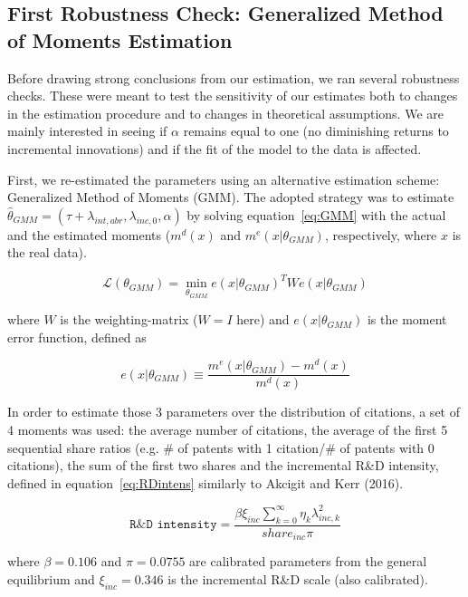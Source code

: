 \documentclass[letterpaper,12pt]{article}
\theoremstyle{definition}
\begin{document}
\subsection{First Robustness Check: Generalized Method of Moments Estimation}

Before drawing strong conclusions from our estimation, we ran several robustness checks. These were meant to test the sensitivity of our estimates both to changes in the estimation procedure and to changes in theoretical assumptions. We are mainly interested in seeing if $\alpha$ remains equal to one (no diminishing returns to incremental innovations) and if the fit of the model to the data is affected.

First, we re-estimated the parameters using an alternative estimation scheme: Generalized Method of Moments (GMM). The adopted strategy was to estimate $\hat{\theta}_{GMM} = (\tau + \lambda_{int,abr}, \lambda_{inc,0}, \alpha)$ by solving equation~\eqref{eq:GMM} with the actual and the estimated moments ($m^d(x)$ and $m^e(x|\theta_{GMM})$, respectively, where $x$ is the real data).

\begin{equation} \label{eq:GMM}
\mathscr{L}(\theta_{GMM}) =  \min\limits_{\theta_{GMM}}e(x|\theta_{GMM})^TWe(x|\theta_{GMM})
\end{equation}

\noindent where $W$ is the weighting-matrix ($W = I$ here) and $e(x|\theta_{GMM})$ is the moment error function, defined as

\begin{equation} \label{eq:GMM_error}
e(x|\theta_{GMM}) \equiv \frac{m^e(x|\theta_{GMM}) - m^d(x)}{m^d(x)}
\end{equation}

In order to estimate those 3 parameters over the distribution of citations, a set of 4 moments was used: the average number of citations, the average of the first 5 sequential share ratios (e.g. \# of patents with 1 citation/\# of patents with 0 citations), the sum of the first two shares and the incremental R\&D intensity, defined in equation~\eqref{eq:RDintens} similarly to Akcigit and Kerr (2016).

\begin{equation} \label{eq:RDintens}
\texttt{R\&D intensity} = \frac{\beta\xi_{inc}\displaystyle\sum_{k=0}^{\infty}\eta_k\lambda_{inc,k}^2}{share_{inc}\pi}
\end{equation}

\noindent where $\beta = 0.106$ and $\pi = 0.0755$ are calibrated parameters from the general equilibrium and $\xi_{inc} = 0.346$ is the incremental R\&D scale (also calibrated).
\end{document}
